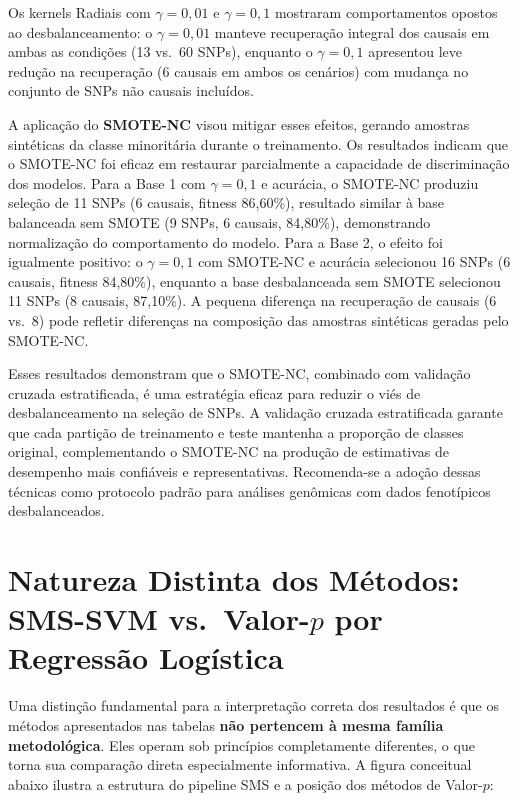 \documentclass[12pt,a4paper]{article}
\newcommand{\novo}[1]{\textcolor{corNova}{#1}}
\begin{document}
\novo{Os kernels Radiais com $\gamma = 0{,}01$ e $\gamma = 0{,}1$ mostraram comportamentos opostos ao desbalanceamento: o $\gamma = 0{,}01$ manteve recuperação integral dos causais em ambas as condições (13 vs.\ 60 SNPs), enquanto o $\gamma = 0{,}1$ apresentou leve redução na recuperação (6 causais em ambos os cenários) com mudança no conjunto de SNPs não causais incluídos.}

\novo{A aplicação do \textbf{SMOTE-NC} visou mitigar esses efeitos, gerando amostras sintéticas da classe minoritária durante o treinamento. Os resultados indicam que o SMOTE-NC foi eficaz em restaurar parcialmente a capacidade de discriminação dos modelos. Para a Base 1 com $\gamma = 0{,}1$ e acurácia, o SMOTE-NC produziu seleção de 11 SNPs (6 causais, fitness 86,60\%), resultado similar à base balanceada sem SMOTE (9 SNPs, 6 causais, 84,80\%), demonstrando normalização do comportamento do modelo. Para a Base 2, o efeito foi igualmente positivo: o $\gamma = 0{,}1$ com SMOTE-NC e acurácia selecionou 16 SNPs (6 causais, fitness 84,80\%), enquanto a base desbalanceada sem SMOTE selecionou 11 SNPs (8 causais, 87,10\%). A pequena diferença na recuperação de causais (6 vs.\ 8) pode refletir diferenças na composição das amostras sintéticas geradas pelo SMOTE-NC.}

\novo{Esses resultados demonstram que o SMOTE-NC, combinado com validação cruzada estratificada, é uma estratégia eficaz para reduzir o viés de desbalanceamento na seleção de SNPs. A validação cruzada estratificada garante que cada partição de treinamento e teste mantenha a proporção de classes original, complementando o SMOTE-NC na produção de estimativas de desempenho mais confiáveis e representativas. Recomenda-se a adoção dessas técnicas como protocolo padrão para análises genômicas com dados fenotípicos desbalanceados.}

\section*{\novo{Natureza Distinta dos Métodos: SMS-SVM vs.\ Valor-$p$ por Regressão Logística}}

\novo{Uma distinção fundamental para a interpretação correta dos resultados é que os métodos apresentados nas tabelas \textbf{não pertencem à mesma família metodológica}. Eles operam sob princípios completamente diferentes, o que torna sua comparação direta especialmente informativa. A figura conceitual abaixo ilustra a estrutura do pipeline SMS e a posição dos métodos de Valor-$p$:}
\end{document}
